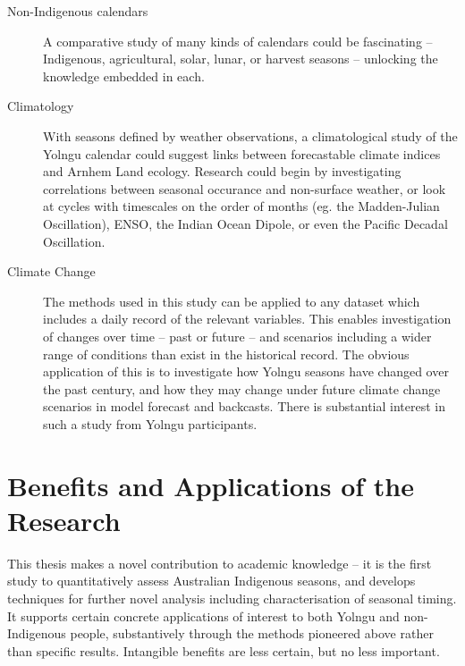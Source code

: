 \begin{description}
\item[Non-Indigenous calendars]
    A comparative study of many kinds of calendars could be fascinating --
    Indigenous, agricultural, solar, lunar, or harvest seasons -- unlocking
    the knowledge embedded in each.

\item[Climatology]
    With seasons defined by weather observations, a climatological study of the
    Yolngu calendar could suggest links between forecastable climate indices
    and Arnhem Land ecology.  Research could begin by investigating correlations
    between seasonal occurance and non-surface weather, or look at cycles with
    timescales on the order of months (eg. the Madden-Julian Oscillation), ENSO,
    the Indian Ocean Dipole, or even the Pacific Decadal Oscillation.

\item[Climate Change]
    The methods used in this study can be applied to any dataset which
    includes a daily record of the relevant variables.  This enables
    investigation of changes over time -- past or future -- and scenarios
    including a wider range of conditions than exist in the historical record.
    The obvious application of this is to investigate how Yolngu seasons have
    changed over the past century, and how they may change under future climate
    change scenarios in model forecast and backcasts.  There is substantial
    interest in such a study from Yolngu participants.
\end{description}



\section{Benefits and Applications of the Research}
\label{sec:applications-benefits}


This thesis makes a novel contribution to academic knowledge -- it is the
first study to quantitatively assess Australian Indigenous seasons, and
develops techniques for further novel analysis including characterisation
of seasonal timing.
%
It supports certain concrete applications of interest to both Yolngu and
non-Indigenous people, substantively through the methods pioneered above
rather than specific results.  Intangible benefits are less certain, but
no less important.


